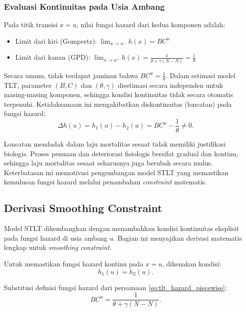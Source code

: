 \subsubsection{Evaluasi Kontinuitas pada Usia Ambang}

Pada titik transisi $x = u$, nilai fungsi hazard dari kedua komponen adalah:
\begin{itemize}
    \item Limit dari kiri (Gompertz): $\lim_{x \to u^-} h(x) = BC^u$
    \item Limit dari kanan (GPD): $\lim_{x \to u^+} h(x) = \frac{1}{\theta + \gamma(N-N)} = \frac{1}{\theta}$
\end{itemize}

Secara umum, tidak terdapat jaminan bahwa $BC^u = \frac{1}{\theta}$. Dalam estimasi model TLT, parameter $(B, C)$ dan $(\theta, \gamma)$ diestimasi secara independen untuk masing-masing komponen, sehingga kondisi kontinuitas tidak secara otomatis terpenuhi. Ketidaksamaan ini mengakibatkan diskontinuitas (loncatan) pada fungsi hazard:
\begin{equation}
\Delta h(u) = h_1(u) - h_2(u) = BC^u - \frac{1}{\theta} \neq 0.
\label{eq:hazard_jump}
\end{equation}



Loncatan mendadak dalam laju mortalitas sesaat tidak memiliki justifikasi biologis. Proses penuaan dan deteriorasi fisiologis bersifat gradual dan kontinu, sehingga laju mortalitas sesaat seharusnya juga berubah secara mulus. Keterbatasan ini memotivasi pengembangan model STLT yang memastikan kemulusan fungsi hazard melalui penambahan \textit{constraint} matematis.

\subsection{Derivasi Smoothing Constraint}

Model STLT dikembangkan dengan menambahkan kondisi kontinuitas eksplisit pada fungsi hazard di usia ambang $u$. Bagian ini menyajikan derivasi matematis lengkap untuk \textit{smoothing constraint}.

Untuk memastikan fungsi hazard kontinu pada $x = u$, dikenakan kondisi:
\begin{equation}
h_1(u) = h_2(u).
\label{eq:smoothing_condition}
\end{equation}

Substitusi definisi fungsi hazard dari persamaan \eqref{eq:tlt_hazard_piecewise}:
\begin{equation}
BC^u = \frac{1}{\theta + \gamma(N-N)}.
\label{eq:smoothing_substitution}
\end{equation}

